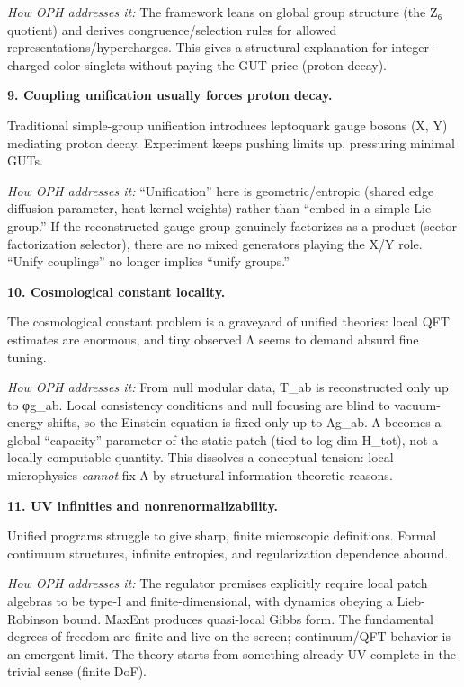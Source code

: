 \documentclass[
]{article}
\begin{document}
\emph{How OPH addresses it:} The framework leans on global group
structure (the Z₆ quotient) and derives congruence/selection rules for
allowed representations/hypercharges. This gives a structural
explanation for integer-charged color singlets without paying the GUT
price (proton decay).

\textbf{9. Coupling unification usually forces proton decay.}

Traditional simple-group unification introduces leptoquark gauge bosons
(X, Y) mediating proton decay. Experiment keeps pushing limits up,
pressuring minimal GUTs.

\emph{How OPH addresses it:} ``Unification'' here is geometric/entropic
(shared edge diffusion parameter, heat-kernel weights) rather than
``embed in a simple Lie group.'' If the reconstructed gauge group
genuinely factorizes as a product (sector factorization selector), there
are no mixed generators playing the X/Y role. ``Unify couplings'' no
longer implies ``unify groups.''

\textbf{10. Cosmological constant locality.}

The cosmological constant problem is a graveyard of unified theories:
local QFT estimates are enormous, and tiny observed Λ seems to demand
absurd fine tuning.

\emph{How OPH addresses it:} From null modular data, T\_ab is
reconstructed only up to φg\_ab. Local consistency conditions and null
focusing are blind to vacuum-energy shifts, so the Einstein equation is
fixed only up to Λg\_ab. Λ becomes a global ``capacity'' parameter of
the static patch (tied to log dim H\_tot), not a locally computable
quantity. This dissolves a conceptual tension: local microphysics
\emph{cannot} fix Λ by structural information-theoretic reasons.

\textbf{11. UV infinities and nonrenormalizability.}

Unified programs struggle to give sharp, finite microscopic definitions.
Formal continuum structures, infinite entropies, and regularization
dependence abound.

\emph{How OPH addresses it:} The regulator premises explicitly require
local patch algebras to be type-I and finite-dimensional, with dynamics
obeying a Lieb-Robinson bound. MaxEnt produces quasi-local Gibbs form.
The fundamental degrees of freedom are finite and live on the screen;
continuum/QFT behavior is an emergent limit. The theory starts from
something already UV complete in the trivial sense (finite DoF).
\end{document}
